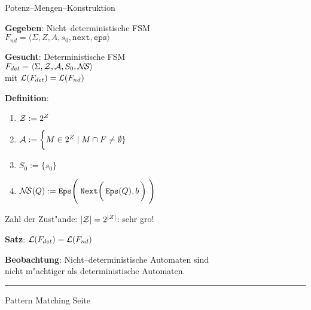 
\begin{slide}{}
\normalsize

\begin{center}
Potenz--Mengen--Konstruktion
\end{center}
\vspace*{0.5cm}

\footnotesize
\textbf{Gegeben}: Nicht--deterministische FSM \\[0.3cm]
\hspace*{1.3cm} $F_{nd} = \langle \Sigma, Z, A, s_0, \mathtt{next}, \mathtt{eps}  \rangle$ 

\textbf{Gesucht}: Deterministische FSM \\[0.3cm]
\hspace*{1.3cm} $F_{det} = \langle \Sigma, {\cal Z}, {\cal A}, S_0, {\cal N\!S}  \rangle$  \\[0.3cm]
mit ${\cal L}(F_{det}) = {\cal L}(F_{nd})$

\textbf{Definition}:
\begin{enumerate}
\item ${\cal Z} := 2^Z$
\item ${\cal A} := \bigg\{ M \in 2^Z \;|\; M \cap F \not = \emptyset \}$
\item $S_0 := \{s_0\}$
\item ${\cal N\!S}(Q) := \mathtt{Eps}\Bigg(\; \mathtt{Next}\bigg(\, \mathtt{Eps}(Q), b \,\bigg) \;\Bigg)$
\end{enumerate}
Zahl der Zust"ande: $|{\cal Z}| = 2^{|Z|}$: sehr gro\3!

\textbf{Satz}:  ${\cal L}(F_{det}) = {\cal L}(F_{nd})$

\textbf{Beobachtung}: Nicht--deterministische Automaten sind \\
nicht m"achtiger als deterministische Automaten.

\vspace*{\fill}
\tiny \addtocounter{mypage}{1}
\rule{17cm}{1mm}
Pattern Matching \hspace*{\fill} Seite 
\end{slide}


